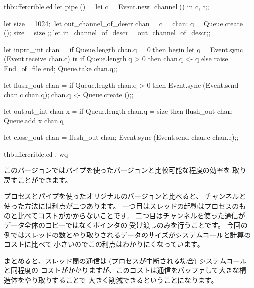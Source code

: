 \begin{example}
\begin{listingcodefile}{thbuffercrible.ed}
let pipe () = let c = Event.new_channel () in c, c;;

let size = 1024;;
let out_channel_of_descr chan =
  { c = chan; q = Queue.create (); size = size };;
let in_channel_of_descr = out_channel_of_descr;;

let input_int chan =
  if Queue.length chan.q = 0 then begin
    let q = Event.sync (Event.receive chan.c) in
    if Queue.length q > 0 then chan.q <- q
    else raise End_of_file
  end;
  Queue.take chan.q;;

let flush_out chan =
  if Queue.length chan.q > 0 then Event.sync (Event.send chan.c chan.q);
  chan.q <- Queue.create ();;

let output_int chan x =
  if Queue.length chan.q = size then flush_out chan;
  Queue.add x chan.q

let close_out chan =
  flush_out chan;
  Event.sync (Event.send chan.c chan.q);;
\end{listingcodefile}
%
\begin{codefile}{thbuffercrible.ed}
.
wq
\end{codefile}
%
このバージョンではパイプを使ったバージョンと比較可能な程度の効率を
取り戻すことができます。

プロセスとパイプを使ったオリジナルのバージョンと比べると、
チャンネルと使った方法には利点が二つあります。
一つ目はスレッドの起動はプロセスのものと比べてコストがかからないことです。
二つ目はチャンネルを使った通信がデータ全体のコピーではなくポインタの
受け渡しのみを行うことです。
今回の例ではスレッドの数とやり取りされるデータのサイズがシステムコールと計算のコストに比べて
小さいのでこの利点はわかりにくなっています。

まとめると、スレッド間の通信は (プロセスが中断される場合) システムコールと同程度の
コストがかかりますが、このコストは通信をバッファして大きな構造体をやり取りすることで
大きく削減できるということになります。
\end{example}

